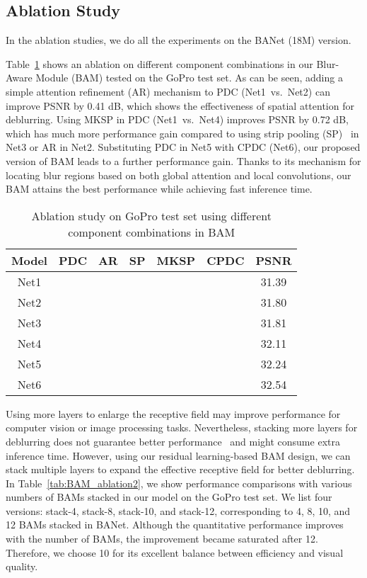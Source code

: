 \subsection{Ablation Study}
In the ablation studies, we do all the experiments on the BANet (18M) version.

Table~\ref{tab:BAM_ablation} shows an ablation on different component combinations in our Blur-Aware Module (BAM) tested on the GoPro test set. As can be seen, adding a simple attention refinement (AR) mechanism to PDC (Net1~vs.~Net2) can improve PSNR by 0.41 dB, which shows the effectiveness of spatial attention for deblurring.
Using MKSP in PDC (Net1~vs.~Net4) improves PSNR by 0.72 dB, which has much more performance gain compared to using strip pooling (SP)~\cite{hou2020strip} in Net3 or AR in Net2.   
Substituting PDC in Net5 with CPDC (Net6), our proposed version of BAM leads to a further performance gain.
Thanks to its mechanism for locating blur regions based on both global attention and local convolutions, our BAM attains the best performance while achieving fast inference time.    

\begin{table}[t!]
\centering
\setlength{\tabcolsep}{3mm}
\caption{Ablation study on GoPro test set using different component combinations in BAM}
\begin{tabular}{c|cccccc}\hline
Model & PDC & AR & SP &  MKSP & CPDC & PSNR \\\hline
Net1  &  &   &  &  & & 31.39   \\
Net2  &  &  & & & & 31.80  \\
Net3  &  & &  & & & 31.81  \\
Net4  &  & &  &  & & 32.11  \\
Net5  &  &  &  &  & & 32.24  \\
Net6  & &  &  &  &  & 32.54  \\
\hline
\end{tabular}
\label{tab:BAM_ablation}
\end{table}

Using more layers to enlarge the receptive field may improve performance for computer vision or image processing tasks. 
Nevertheless, stacking more layers for deblurring does not guarantee better performance~\cite{SAPN2020} and might consume extra inference time. 
However, using our residual learning-based BAM design, we can stack multiple layers to expand the effective receptive field for better deblurring. 
In Table~\ref{tab:BAM_ablation2}, we show performance comparisons with various numbers of BAMs stacked in our model on the GoPro test set. 
We list four versions: stack-4, stack-8, stack-10, and stack-12, corresponding to 4, 8, 10, and 12 BAMs stacked in BANet. 
Although the quantitative performance improves with the number of  BAMs, the improvement became saturated after 12. 
Therefore, we choose 10 for its excellent balance between efficiency and visual quality.

